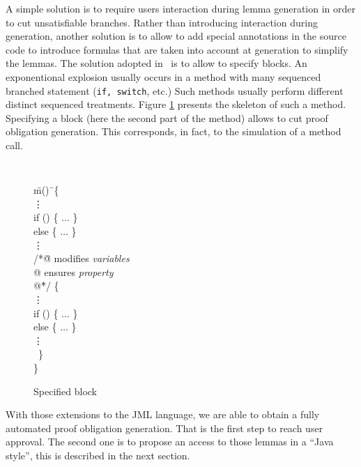  A simple solution is to require users interaction during lemma
 generation in order to cut unsatisfiable branches.  Rather than introducing
 interaction during generation, another solution is to allow to add
 special annotations in the source code to introduce formulas that are
 taken into account at generation to simplify the lemmas.
 The solution adopted in \JACK\ is to allow to specify blocks. An exponentional explosion usually occurs
in a method with many sequenced branched statement ({\tt if, switch}, etc.) Such methods usually perform
different distinct sequenced treatments.
 Figure \ref{Specified_block} presents the skeleton of such a method. Specifying a block (here the second part
of the method) allows to cut proof obligation generation. This corresponds, in fact, to the simulation of a
method call.
\begin{figure}[htp]
{\tt
\begin{tabbing}
 \hspace{3 cm} \=m()\= \ \{ \\
 \> \> \vdots \\
 \> \> if () \{ $\hdots$ \} \\
 \> \> else \{ $\hdots$ \}   \\
 \> \> \vdots                   \\
 \> \> /*\=@ modifies {\it variables}  \\
 \> \> \> @ ensures {\it property} \\
 \> \> \> @\=*/ \{ \\
 \> \> \> \> \vdots \\
 \> \> \> \> if () \{ $\hdots$ \} \\
 \> \> \> \> else \{ $\hdots$ \}   \\
 \> \> \> \> \vdots                   \\
 \> \> \ \} \\
 \> \> \}
\end{tabbing}
}
 \caption{\sc Specified block}
 \label{Specified_block}
\end{figure}

 With those extensions to the JML language, we are able to obtain a fully automated proof obligation generation.
That is the first step to reach user approval. The second one is to propose an access to those lemmas in a
``Java style'', this is described in the next section.
